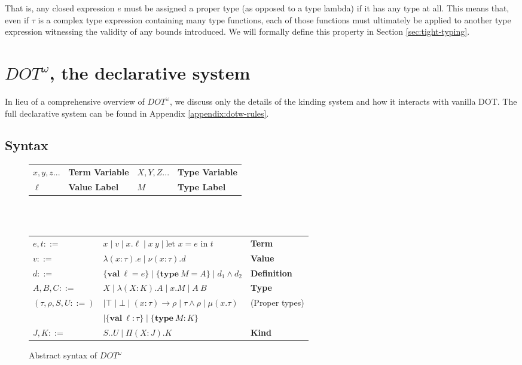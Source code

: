 \documentclass[a4paper, 10pt]{article}
\newcommand{\DOTw}{\ensuremath{DOT^\omega}}
\newcommand{\interval}[2]{#1 .. #2}
\newcommand{\KDepArr}[3]{\Pi(#1:#2).#3}
\newcommand{\TDepArr}[3]{(#1:#2) \rightarrow #3}
\newcommand{\objtyp}[3]{\{ \textbf{#1}\ #2 : #3 \}}
\newcommand{\objval}[3]{\{ \textbf{#1}\ #2 = #3 \}}
\begin{document}
That is, any closed expression $e$ must be assigned a proper type (as opposed
to a type lambda) if it has any type at all. This means that, even if $\tau$ is
a complex type expression containing many type functions, each of those
functions must ultimately be applied to another type expression witnessing the
validity of any bounds introduced. We will formally define this property in
Section \ref{sec:tight-typing}.

\section{$\DOTw$, the declarative system}

In lieu of a comprehensive overview of $\DOTw{}$, we discuss only the details
of the kinding system and how it interacts with vanilla DOT. The full
declarative system can be found in Appendix \ref{appendix:dotw-rules}.

\subsection{Syntax}

\begin{figure}[ht]
  \centering
  \begin{tabularx}{\linewidth}{XXXX}
    $x,y,z$... & \textbf{Term Variable} & $X,Y,Z$... & \textbf{Type Variable}\\
    $\ell$ & \textbf{Value Label} & $M$ & \textbf{Type Label} \\
  \end{tabularx}
  \hfill \\
  \hfill \\
  \begin{tabularx}{\linewidth}{XlX}
    $e,t ::=$ &
    $x \mid v \mid x.\ell \mid x\ y \mid \text{let }x = e\text{ in }t$
      & \textbf{Term} \\
    $v ::=$ & $\lambda(x:\tau).e \mid \nu(x:\tau).d$ & \textbf{Value} \\
    $d ::=$ & $\objval{val}{\ell}{e} \mid \objval{type}{M}{A} \mid
      d_1 \land d_2$ & \textbf{Definition} \\
    $A,B,C ::=$ &
    $X \mid \lambda(X:K).A \mid x.M \mid A\ B$ & \textbf{Type} \\
    $(\tau, \rho, S, U ::=)$ &
      $\mid \top \mid \bot \mid \TDepArr{x}{\tau}{\rho}
      \mid \tau \land \rho \mid \mu(x.\tau)$ & (Proper types) \\
    & $\mid \objtyp{val}{\ell}{\tau} \mid \objtyp{type}{M}{K}$ & \\
    $J,K ::=$ & $\interval{S}{U} \mid \KDepArr{X}{J}{K}$ & \textbf{Kind} \\
  \end{tabularx}
  \caption{Abstract syntax of $\DOTw{}$}
\end{figure}
\end{document}
